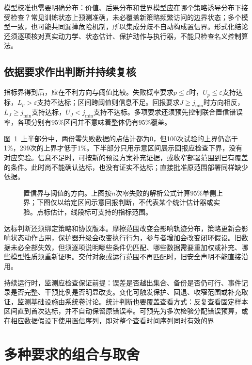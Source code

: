 模型校准也需要明确分布：价值、后果分布和世界模型应在哪个策略诱导分布下接受检查？常见训练状态上预测准确，未必覆盖新策略频繁访问的边界状态；多个模型一致，也可能共同漏掉危险机制，所以集成分歧不自动构成置信界。形式化结论还须逐项核对真实动力学、状态估计、保护动作与执行器，不能只检查名义控制算法。

\subsection{依据要求作出判断并持续复核}
\label{sec:rl-trustworthy-decision}

指标界得到后，应在不利方向与阈值比较。失败概率要求$p\leq\varepsilon$时，$U_p\leq\varepsilon$支持达标，$L_p>\varepsilon$支持不达标；区间跨阈值则信息不足。回报要求$J\geq j_{\min}$时方向相反，$L_J\geq j_{\min}$支持达标，$U_J<j_{\min}$支持不达标。多项要求还须预先控制联合置信错误率，各项分别有95\%区间并不意味着整体仍有95\%覆盖。

图~\ref{fig:rl-trustworthy-intervals}~上半部分中，两份零失败数据的点估计都为0，但100次试验的上界仍高于1\%，299次的上界才低于1\%。下半部分只用示意区间展示回报应检查下界，没有对应实验。信息不足时，可按新的预设方案补充证据，或收窄部署范围到已有覆盖的条件。此时尚不能确认达标，也没有证实不达标；直接批准原范围部署同样缺少依据。

\begin{figure}[t]
  \centering
  
  \caption{置信界与阈值的方向。上图按$n$次零失败的解析公式计算95\%单侧上界；下图仅以给定区间示意回报判断，不代表某个统计估计器或实验。点标估计，线段标可支持的指标范围。}
  \label{fig:rl-trustworthy-intervals}
\end{figure}

达标判断还须绑定策略和协议版本。摩擦范围改变会影响轨迹分布，策略更新会影响状态动作占用，保护器升级会改变执行行为，参与者增加会改变闭环假设。旧数据未必全部失效，但须逐项说明哪些条件仍匹配、哪些数据需要重加权或补充、哪些模型性质须重新证明。交付对象或运行范围不再匹配时，旧安全声明不能直接沿用。

持续运行时，监测应检查保证前提：误差是否越出集合、备份是否仍可行、事件记录是否完整、干预比例是否明显改变。变化可触发保护、回退、收窄范围或补充取证，监测基础设施由系统卷讨论。统计判断也要覆盖查看方式：反复查看固定样本区间直到首次达标，并不自动保留原错误率。可预先为多次检验分配错误预算，或在相应数据假设下使用置信序列，即对整个查看时间序列同时有效的界

\section{多种要求的组合与取舍}
\label{sec:rl-trustworthy-combination}

